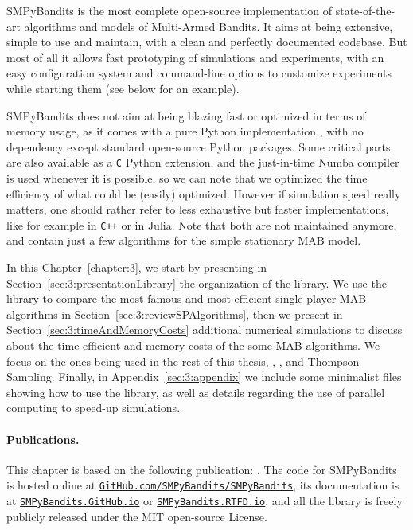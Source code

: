 SMPyBandits is the most complete open-source implementation of state-of-the-art algorithms and models of Multi-Armed Bandits.
It aims at being extensive, simple to use and maintain, with a clean and perfectly documented codebase. But most of all it allows fast prototyping of simulations and experiments, with an easy configuration system and command-line options to customize experiments while starting them (see below for an example).

SMPyBandits does not aim at being blazing fast or optimized in terms of memory usage, as it comes with a pure Python implementation \cite{python}, with no dependency except standard open-source Python packages.
Some critical parts are also available as a \texttt{C} Python extension, and the just-in-time Numba compiler \cite{numba} is used whenever it is possible, so we can note that we optimized the time efficiency of what could be (easily) optimized.
However if simulation speed really matters, one should rather refer to less exhaustive but faster implementations, like for example \cite{TorLibbandit} in \texttt{C++} or \cite{VishMABjl} in Julia. Note that both are not maintained anymore, and contain just a few algorithms for the simple stationary MAB model.

In this Chapter~\ref{chapter:3}, we start by presenting in Section~\ref{sec:3:presentationLibrary} the organization of the library.
We use the library to compare the most famous and most efficient single-player MAB algorithms in Section~\ref{sec:3:reviewSPAlgorithms},
then we present in Section~\ref{sec:3:timeAndMemoryCosts} additional numerical simulations to discuss about the time efficient and memory costs of the some MAB algorithms. We focus on the ones being used in the rest of this thesis, \UCB, \klUCB, and Thompson Sampling.
%
Finally, in Appendix~\ref{sec:3:appendix} we include some minimalist files showing how to use the library, as well as details regarding the use of parallel computing to speed-up simulations.


\paragraph{Publications.}
%
This chapter is based on the following publication: \cite{SMPyBanditsJMLR}.
The code for SMPyBandits is hosted online at \texttt{\href{https://GitHub.com/SMPyBandits/SMPyBandits/}{GitHub.com/SMPyBandits/SMPyBandits}}, its documentation is at \texttt{\href{https://SMPyBandits.GitHub.io/}{SMPyBandits.GitHub.io}} or \texttt{\href{https://SMPyBandits.RTFD.io/}{SMPyBandits.RTFD.io}}, and all the library is freely publicly released under the MIT open-source License.


